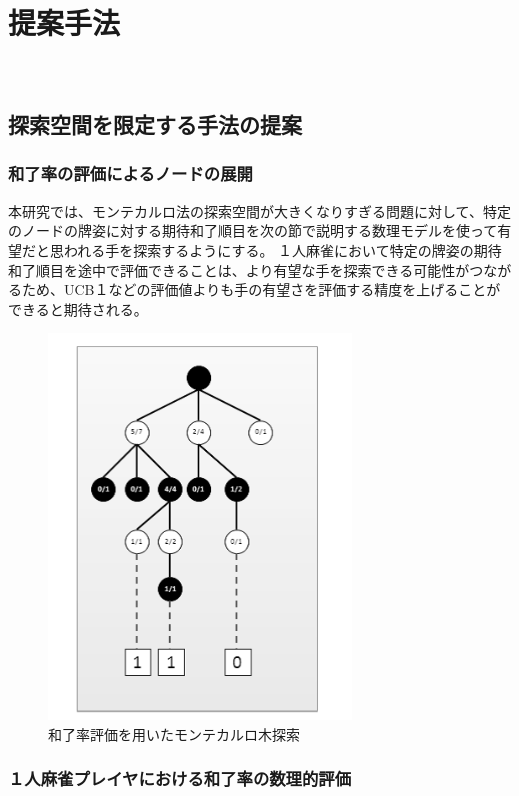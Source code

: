 \chapter{提案手法}　%
\label{chap:approach}

\section{探索空間を限定する手法の提案}
\subsection{和了率の評価によるノードの展開}

本研究では、モンテカルロ法の探索空間が大きくなりすぎる問題に対して、特定のノードの牌姿に対する期待和了順目を次の節で説明する数理モデルを使って有望だと思われる手を探索するようにする。
１人麻雀において特定の牌姿の期待和了順目を途中で評価できることは、より有望な手を探索できる可能性がつながるため、UCB１などの評価値よりも手の有望さを評価する精度を上げることができると期待される。

\begin{figure}
 \centering
 \includegraphics[keepaspectratio, scale=1.0,bb=0 0 304 387]
      {img/UCB.png}
 \caption{和了率評価を用いたモンテカルロ木探索}
 \label{monte2}
\end{figure}

\subsection{１人麻雀プレイヤにおける和了率の数理的評価}

